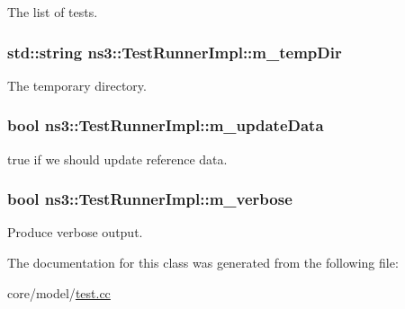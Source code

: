 The list of tests. 

\subsubsection[{\texorpdfstring{m\+\_\+temp\+Dir}{m_tempDir}}]{\setlength{\rightskip}{0pt plus 5cm}std\+::string ns3\+::\+Test\+Runner\+Impl\+::m\+\_\+temp\+Dir\hspace{0.3cm}{\ttfamily [private]}}\hypertarget{classns3_1_1TestRunnerImpl_a659f2ebce866a2fc11e8dfee14b8b802}{}\label{classns3_1_1TestRunnerImpl_a659f2ebce866a2fc11e8dfee14b8b802}


The temporary directory. 

\subsubsection[{\texorpdfstring{m\+\_\+update\+Data}{m_updateData}}]{\setlength{\rightskip}{0pt plus 5cm}bool ns3\+::\+Test\+Runner\+Impl\+::m\+\_\+update\+Data\hspace{0.3cm}{\ttfamily [private]}}\hypertarget{classns3_1_1TestRunnerImpl_a5751d5379b5bde6b54cfb68151ddf8b3}{}\label{classns3_1_1TestRunnerImpl_a5751d5379b5bde6b54cfb68151ddf8b3}


{\ttfamily true} if we should update reference data. 

\subsubsection[{\texorpdfstring{m\+\_\+verbose}{m_verbose}}]{\setlength{\rightskip}{0pt plus 5cm}bool ns3\+::\+Test\+Runner\+Impl\+::m\+\_\+verbose\hspace{0.3cm}{\ttfamily [private]}}\hypertarget{classns3_1_1TestRunnerImpl_ad9188e308ca5a1822ca9c49dd5f9b510}{}\label{classns3_1_1TestRunnerImpl_ad9188e308ca5a1822ca9c49dd5f9b510}


Produce verbose output. 



The documentation for this class was generated from the following file\+:\begin{DoxyCompactItemize}
\item 
core/model/\hyperlink{test_8cc}{test.\+cc}\end{DoxyCompactItemize}
